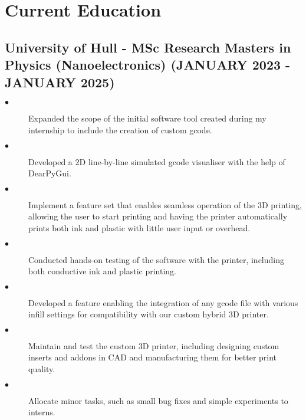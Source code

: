 \documentclass{article}
\begin{document}
\section{Current Education}
\noindent
\begin{minipage}[t]{1\textwidth}
    \subsection{University of Hull \textnormal{- MSc Research Masters in Physics (Nanoelectronics)} \footnotesize{(JANUARY 2023 - JANUARY 2025)}}
    \normalsize{}
    \begin{description}
        \item[$\bullet$]Expanded the scope of the initial software tool created during my internship to include the creation of custom gcode. 
        \item[$\bullet$]Developed a 2D line-by-line simulated gcode visualiser with the help of DearPyGui.
        \item[$\bullet$]Implement a feature set that enables seamless operation of the 3D printing, allowing the user to start printing and having the printer automatically prints both ink and plastic with little user input or overhead.
        \item[$\bullet$]Conducted hands-on testing of the software with the printer, including both conductive ink and plastic printing.
        \item[$\bullet$]Developed a feature enabling the integration of any gcode file with various infill settings for compatibility with our custom hybrid 3D printer. 
        \item[$\bullet$]Maintain and test the custom 3D printer, including designing custom inserts and addons in CAD and manufacturing them for better print quality.
        \item[$\bullet$]Allocate minor tasks, such as small bug fixes and simple experiments to interns. 
    \end{description}
\end{minipage}
\end{document}
